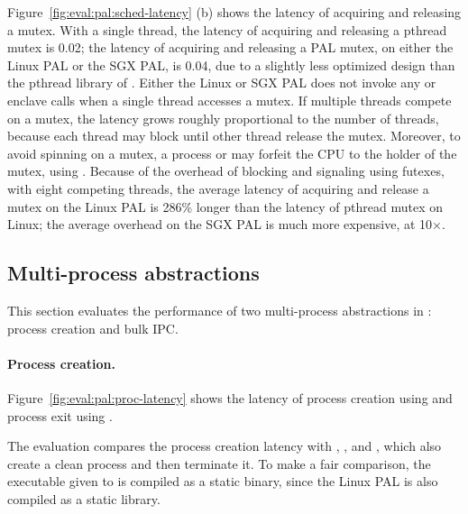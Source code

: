 Figure~\ref{fig:eval:pal:sched-latency} (b) shows the latency of acquiring and releasing a mutex.
With a single thread, the latency of acquiring and releasing a pthread mutex is \roughly{}0.02\usec{};
the latency of acquiring and releasing a PAL mutex,
on either the Linux PAL or the SGX PAL,
is \roughly{}0.04\usec{}, due to a slightly less optimized design than the pthread library of \glibc{}.
Either the Linux or SGX PAL does not invoke any \linuxapi{} or enclave calls
when a single thread accesses a mutex.
If multiple threads compete on a mutex, the latency grows roughly proportional
to the number of threads,
because each thread may block until other thread release the mutex.
Moreover, to avoid spinning on a mutex,
a process or \picoproc{} may forfeit the CPU to the holder of the mutex, using .
Because of the overhead of blocking and signaling using futexes,
with eight competing threads,
the average latency of acquiring and release a mutex
on the Linux PAL is 286\% longer than the latency of pthread mutex on Linux;
the average overhead on the SGX PAL
is much more expensive, at \roughly{}10$\times$.
 






\subsection{Multi-process abstractions}
\label{sec:eval:pal:multi-proc}

This section evaluates the performance of two multi-process abstractions in \thehostabi:
process creation and bulk IPC.



\paragraph{Process creation.}
Figure~\ref{fig:eval:pal:proc-latency}
shows the latency of process creation using 
and process exit
using .



The evaluation compares the process creation latency
with , , and ,
which also create a clean process
and then terminate it.
To make a fair comparison,
the executable given to 
is compiled as a static binary,
since the Linux PAL is also compiled as a static library.



